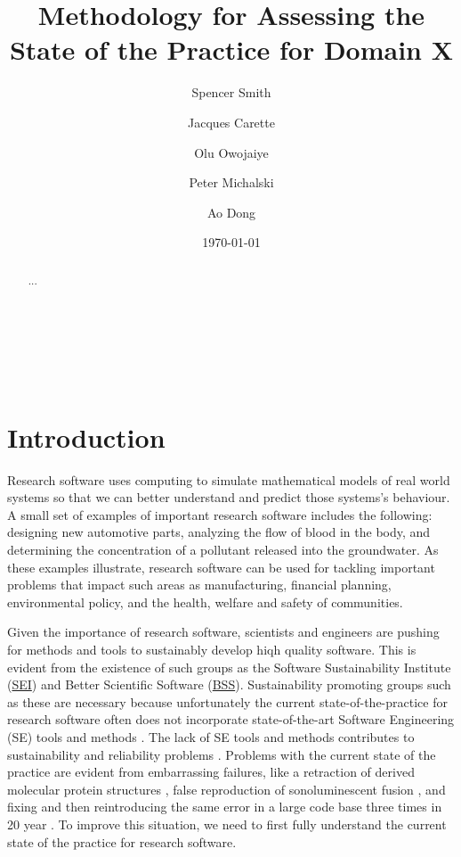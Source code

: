 \documentclass[letterpaper,cleveref]{lipics-v2019}
\title{Methodology for Assessing the State of the Practice for Domain X}
\author{Spencer Smith}{McMaster University, Canada}{smiths@mcmaster.ca}{}{}
\author{Jacques Carette}{McMaster University, Canada}{carette@mcmaster.ca}{}{}
\author{Olu Owojaiye}{McMaster University, Canada}{owojaiyo@mcmaster.ca}{}{}
\author{Peter Michalski}{McMaster University, Canada}{michap@mcmaster.ca}{}{}
\author{Ao Dong}{McMaster University, Canada}{donga9@mcmaster.ca}{}{}
\date{\today}
\theoremstyle{definition}
\begin{document}
\maketitle

\begin{abstract}
	...
\end{abstract}

~\newpage

\tableofcontents

~\newpage

\section{Introduction} \label{SecIntroduction}

Research software uses computing to simulate mathematical models of real world
systems so that we can better understand and predict those systems's behaviour.  A
small set of examples of important research software includes the
following: designing new automotive parts, analyzing the flow of blood in the
body, and determining the concentration of a pollutant released into the
groundwater.  As these examples illustrate, research software can be used for
tackling important problems that impact such areas as manufacturing, financial
planning, environmental policy, and the health, welfare and safety of
communities.

Given the importance of research software, scientists and engineers are pushing
for methods and tools to sustainably develop hiqh quality software.  This is
evident from the existence of such groups as the Software Sustainability
Institute (\href{https://www.software.ac.uk/} {SEI}) and Better Scientific
Software (\href{https://bssw.io/} {BSS}).  Sustainability promoting groups such
as these are necessary because unfortunately the current state-of-the-practice
for research software often does not incorporate state-of-the-art Software
Engineering (SE) tools and methods \citep{JohansonAndHasselbring2018}.  The lack
of SE tools and methods contributes to sustainability and reliability problems
\citep{FaulkEtAl2009}.  Problems with the current state of the practice are
evident from embarrassing failures, like a retraction of derived molecular
protein structures \citep{Miller2006}, false reproduction of sonoluminescent
fusion \citep{PostAndVotta2005}, and fixing and then reintroducing the same
error in a large code base three times in 20 year
\citep{MilewiczAndRaybourn2018}.  To improve this situation, we need to first
fully understand the current state of the practice for research software.
\end{document}
